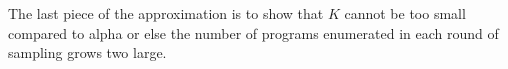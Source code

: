\documentclass{article}
\begin{document}
The last piece of the approximation is to show that $K$ cannot be too small compared to alpha or else the number of programs enumerated in each round of sampling grows two large.
\begin{comment}
\begin{eqnarray}
  \sum_x P(x\text{ survives})& = &C_\alpha 2^{-K} + \sum_{|x|\leq \alpha}\min (1,2^{\alpha - |x| - K})\\
  & < &C_\alpha 2^{-K} + \sum_{|x|\leq \alpha}\min (1,2^{\alpha - L - K})\\
   &= &C_\alpha 2^{-K} + \sum_{|x|\leq \alpha}\min (1,2^{\gamma + \log |S| - K})\\
  &= &C_\alpha 2^{-K} + \sum_{|x|\leq \alpha}\min (1,|S| 2^{\gamma - K})
\end{eqnarray}
if $K > \alpha - L$:
\begin{eqnarray}
  & < &C_\alpha 2^{-K} + \sum_{|x|\leq \alpha}|S| 2^{\gamma - K}  
\end{eqnarray}
but that bound is terrible and takes us into the white region of the heat maps - don't take this route! If $K < \alpha - L$:
\begin{eqnarray}
  & < &C_\alpha 2^{-K} + \sum_{|x|\leq \alpha}1 < |S|\text{, equally useless}
\end{eqnarray}
Trying something else:
\begin{eqnarray}
  \sum_x P(x\text{ survives})& = &C_\alpha 2^{-K} + \sum_{|x|\leq \alpha}\min (1,2^{\alpha - |x| - K})\\
  & < &C_\alpha 2^{-K} + \sum_{|x|\leq \alpha} 2^{\alpha - |x|- K}\\
   &= &2^{-K}(C_\alpha + \sum_{|x|\leq \alpha}2^{\alpha - |x|}) = 2^{-K}|E|\\
& < &2^{-K}|S|2^{\alpha - L}
\end{eqnarray}
Equally useless. Take a different approach: the top is decreasing in $K$ and the bottom is increasing in $K$.
What can this tell us about the optimal value of $K$?
$$
E[tt] < \frac{1 + \sum_x P(x\text{ survives})}{\frac{1}{1 + 2^{ - \gamma}} - 2^{ - \delta}} = \frac{1 + 2^{ - \gamma}}{1 - 2^{ - \delta} - 2^{ - \delta - \gamma}}(1 + \sum_x P(x\text{ survives}))
$$
$\alpha$ is fixed by parameters of the problem and $\gamma$. In contrast $K$ decreases linearly with $\delta$.
\begin{eqnarray}
  \partial_K \log E[tt] &<& \frac{\partial_K (2^{-\delta}+2^{ - \delta - \gamma})}{1 - 2^{ - \delta} - 2^{ - \delta - \gamma}}+...\\
  & = &   \frac{\log 2 \times (2^{-\delta} +2^{ - \delta - \gamma})}{1 - 2^{ - \delta} - 2^{ - \delta - \gamma}}+

\end{comment}
\end{document}
